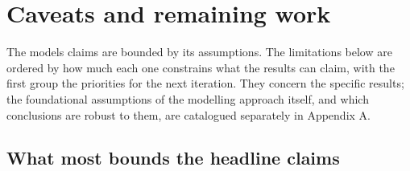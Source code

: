 \documentclass[11pt]{article}
\begin{document}
\hypertarget{caveats}{}
\hypertarget{caveats-and-remaining-work}{%
\section{Caveats and remaining work}\label{caveats-and-remaining-work}}

The model\textquotesingle s claims are bounded by its assumptions. The
limitations below are ordered by how much each one constrains what the
results can claim, with the first group the priorities for the next
iteration. They concern the specific results; the foundational
assumptions of the modelling approach itself, and which conclusions are
robust to them, are catalogued separately in Appendix A.

\hypertarget{what-most-bounds-the-headline-claims}{%
\subsection{What most bounds the headline
claims}\label{what-most-bounds-the-headline-claims}}
\end{document}
